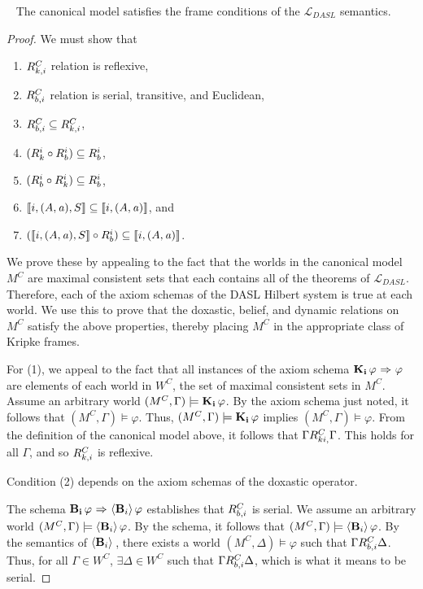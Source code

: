 \begin{lemma}[Canonicity]~\label{canon}
The canonical model satisfies the frame conditions of the $\mathcal{L}_{DASL}$ semantics.\\
\end{lemma}
\begin{proof}
	We must show that
	\begin{enumerate}
	\item $R_{k,i}^C$ relation is reflexive,
	\item $R_{b,i}^C$ relation is serial, transitive, and Euclidean,
	\item $R_{b,i}^C \subseteq R_{k,i}^C$,
	\item $(R_{k}^i \circ R_{b}^i) \subseteq R_{b}^i$, 
	\item $(R_{b}^i \circ R_{k}^i) \subseteq R_{b}^i$,
	\item $\llbracket i,(A,\mathit{a}),S\rrbracket \subseteq \llbracket i,(A,\mathit{a})\rrbracket$, and 	
	\item  $(\llbracket i,(A,\mathit{a}),S\rrbracket \circ R_{b}^i) \subseteq \llbracket i, (A,\mathit{a})\rrbracket$.
	\end{enumerate}
	
	We prove these by appealing to the fact that the worlds in the canonical model $M^C$ are maximal consistent sets that each contains all of the theorems of $\mathcal{L}_{DASL}$. Therefore, each of the axiom schemas of the DASL Hilbert system is true at each world. We use this to prove that the doxastic, belief, and dynamic relations on $M^C$ satisfy the above properties, thereby placing $M^C$ in the appropriate class of Kripke frames.
	
	For (1), we appeal to the fact that all instances of the axiom schema $\mathbf{K}_{\mathbf{i}}\,\varphi {\ \Rightarrow \ } \varphi$ are elements of each world in $W^C$, the set of maximal consistent sets in $M^C$. Assume an arbitrary world $(M^C, \Gamma)\models \mathbf{K}_{\mathbf{i}}\,\varphi$. By the axiom schema just noted, it follows that $(M^C, \Gamma)\models \varphi$. Thus, $(M^C, \Gamma)\models\mathbf{K}_{\mathbf{i}}\,\varphi$ implies $(M^C, \Gamma)\models\varphi$. From the definition of the canonical model above, it follows that $\Gamma R_{ki,}^C\Gamma$. This holds for all $\Gamma$, and so $R_{k,i}^C$ is reflexive.
	
	Condition (2) depends on the axiom schemas of the doxastic operator. 
	
	The schema $\mathbf{B}_{\mathbf{i}}\,\varphi{\ \Rightarrow \ } \langle \mathbf{B}_{i} \rangle\,\varphi$ establishes that $R_{b,i}^C$ is serial. We assume an arbitrary world $(M^C, \Gamma)\models\langle \mathbf{B}_{i} \rangle\,\varphi$. By the schema, it follows that $(M^C,\Gamma)\models\langle \mathbf{B}_{i} \rangle\,\varphi$. By the semantics of $\langle \mathbf{B}_{i} \rangle\,$, there exists a world $(M^C,\Delta)\models\varphi$ such that $\Gamma R_{b,i}^C\Delta$. Thus, for all $\Gamma\in W^C$, $\exists \Delta \in W^C$ such that $\Gamma R_{b,i}^C\Delta$, which is what it means to be serial.
	

\end{proof}
